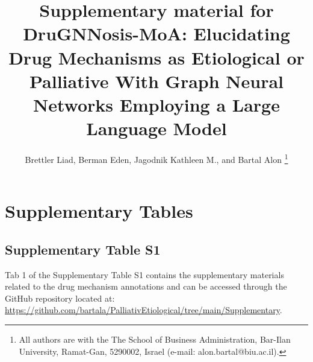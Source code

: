 \documentclass[journal,twoside,web]{ieeecolor}
\begin{document}
\title{Supplementary material for\\ DruGNNosis-MoA: Elucidating Drug Mechanisms as Etiological or Palliative With Graph Neural Networks Employing a Large Language Model}
\author{Brettler Liad, 
Berman Eden,
Jagodnik Kathleen M.,
and 
Bartal Alon
\thanks{
All authors are with the The School of Business Administration, Bar-Ilan University, Ramat-Gan, 5290002, Israel (e-mail: alon.bartal@biu.ac.il).}
}

\maketitle






\appendices

\setcounter{figure}{0}
\renewcommand\thefigure{S\arabic{figure}} %

\section{Supplementary Tables}
\label{sec11}
\subsection{Supplementary Table S1}
Tab 1 of the Supplementary Table S1 contains the supplementary materials related to the drug mechanism annotations and can be accessed through the GitHub repository located at: \url{https://github.com/bartala/PalliativEtiological/tree/main/Supplementary}.
\end{document}
